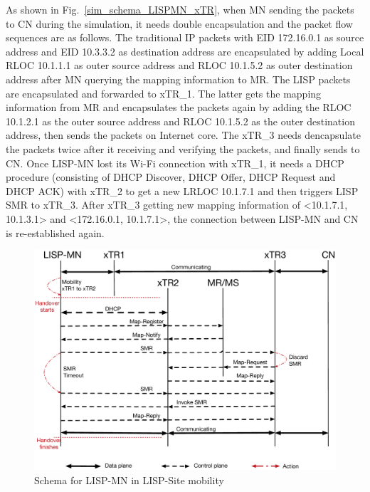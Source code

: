 As shown in Fig.~\ref{sim_schema_LISPMN_xTR}, when MN sending the packets to CN during the simulation, it needs double encapsulation and the packet flow sequences are as follows. The traditional IP packets with EID 172.16.0.1 as source address and EID 10.3.3.2 as destination address are encapsulated by adding Local RLOC 10.1.1.1 as outer source address and RLOC 10.1.5.2 as outer destination address after MN querying the mapping information to MR. The LISP packets are encapsulated and forwarded to xTR\_1. The latter gets the mapping information from MR and encapsulates the packets again by adding the RLOC 10.1.2.1 as the outer source address and RLOC 10.1.5.2 as the outer destination address, then sends the packets on Internet core. The xTR\_3 needs dencapsulate the packets twice after it receiving and verifying the packets, and finally sends to CN. Once LISP-MN lost its Wi-Fi connection with xTR\_1, it needs a DHCP procedure (consisting of DHCP Discover, DHCP Offer, DHCP Request and DHCP ACK) with xTR\_2 to get a new LRLOC 10.1.7.1 and then triggers LISP SMR to xTR\_3. After xTR\_3 getting new mapping information of <10.1.7.1, 10.1.3.1> and <172.16.0.1, 10.1.7.1>, the connection between LISP-MN and CN is re-established again.
\begin{figure}[!th]
	\centering
	\includegraphics[width=\textwidth]{Pics/Mobility_double_encap_schema_SMR_simplify}
	\caption{Schema for LISP-MN in LISP-Site mobility}
	\label{Mobility_double_encap_schema_SMR_simplify}
\end{figure}

